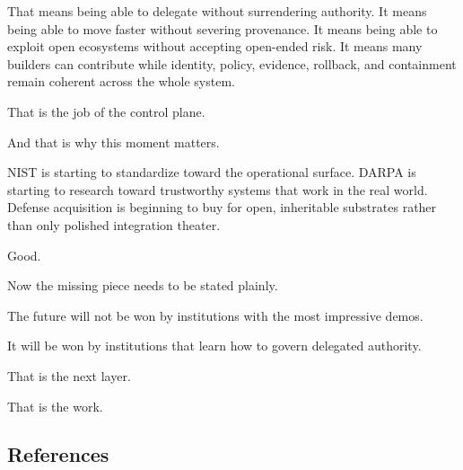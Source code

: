\documentclass[11pt]{article}
\begin{document}
That means being able to delegate without surrendering authority. It
means being able to move faster without severing provenance. It means
being able to exploit open ecosystems without accepting open-ended risk.
It means many builders can contribute while identity, policy, evidence,
rollback, and containment remain coherent across the whole system.

That is the job of the control plane.

And that is why this moment matters.

NIST is starting to standardize toward the operational surface. DARPA is
starting to research toward trustworthy systems that work in the real
world. Defense acquisition is beginning to buy for open, inheritable
substrates rather than only polished integration theater.

Good.

Now the missing piece needs to be stated plainly.

The future will not be won by institutions with the most impressive
demos.

It will be won by institutions that learn how to govern delegated
authority.

That is the next layer.

That is the work.

\hypertarget{references}{%
\subsection{References}\label{references}}
\end{document}
